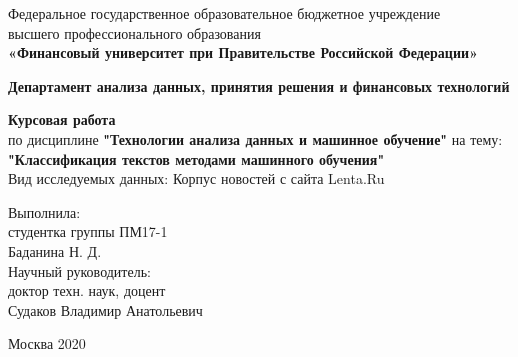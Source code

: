 \documentclass{article}
\begin{document}
                                                         
\newpage
\thispagestyle{empty}

\begin{center}
Федеральное государственное образовательное бюджетное учреждение\\ высшего профессионального образования\\ 
\textbf{«Финансовый университет при Правительстве Российской Федерации»}\\
\end{center}
	
\vspace{2em}
	
\begin{center}
\textbf{Департамент анализа данных, принятия решения и финансовых технологий}\\ 
\end{center}
	
\vspace{2em}
	
\begin{center}
\textbf{Курсовая работа\\
\vspace{3mm}}
по дисциплине \textbf{"Технологии анализа данных и машинное обучение"} на тему: \\ \vspace{2em} \textbf{"Классификация текстов методами машинного обучения"}\\
\vspace{3mm}
Вид исследуемых данных: Корпус новостей с сайта Lenta.Ru\\
\end{center}
	
\vspace{6em}
		
\begin{flushright}
Выполнила:\\
студентка группы ПМ17-1\\
Баданина Н. Д.\\
Научный руководитель:\\
доктор техн. наук, доцент\\
Судаков Владимир Анатольевич
\end{flushright}
	
\vspace{\fill}
	
\begin{center}
Москва 2020
\end{center}

\newpage
	
\end{document}
